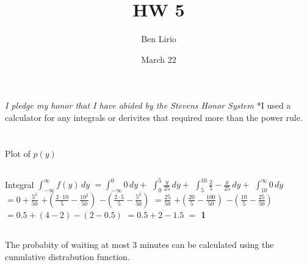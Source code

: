 \documentclass[12pt, letterpaper]{article}
\title{HW 5}
\author{Ben Lirio}
\date{March 22}
\begin{document}
\maketitle
\textit{I pledge my honor that I have abided by the Stevens Honor System}
\newline
*I used a calculator for any integrals or derivites that required more than the power rule.
\section{}
\subsection{}
Plot of $p(y)$
\begin{center}
\end{center}
\subsection{}
Integral $\int_{-\infty}^{\infty} f(y) \,dy$
\newline
\newline
$ = \int_{-\infty}^{0} 0 \, dy +$ 
$ \int_{0}^{5} \frac{y}{25} \, dy +$
$ \int_{5}^{10} \frac{2}{5} - \frac{y}{25} \, dy +$
$ \int_{10}^{\infty} 0 \, dy$ 
\newline
\newline
$ = 0 + \frac{5^{2}}{50}$
$ +(\frac{2\cdot 10}{5}-\frac{10^{2}}{50})$
$ - (\frac{2\cdot 5}{5}-\frac{5^{2}}{50})$
\newline
\newline
$ = \frac{25}{50}$
$ + (\frac{20}{5} - \frac{100}{50})$
$ - (\frac{10}{5} - \frac{25}{50})$
\newline
\newline
$ = 0.5 + (4-2) - (2-0.5)$
$ = 0.5 + 2 - 1.5 $
$ = $ \textbf{1}
\subsection{}
The probabity of waiting at most 3 minutes can be calculated using the cumulative distrabution function.
\end{document}
